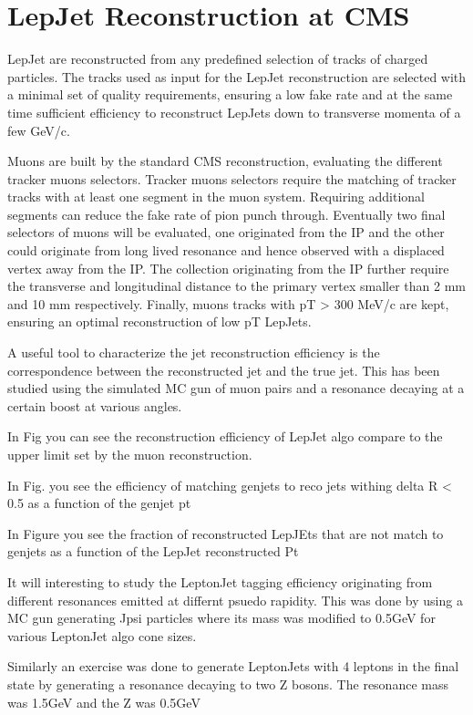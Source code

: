 \section{LepJet Reconstruction at CMS}
LepJet are reconstructed from any predefined selection of tracks of charged particles. 
The tracks used as input for the LepJet reconstruction are selected with a minimal set of quality requirements, ensuring a low fake rate and at the same time sufficient efficiency to reconstruct LepJets down to transverse momenta of a few GeV/c. 

Muons are built by the standard CMS reconstruction, evaluating the different tracker muons selectors.
Tracker muons  selectors require the matching of tracker tracks with at least one segment in the muon system.
Requiring additional segments can reduce the fake rate of pion punch through.
Eventually two final selectors of muons will be evaluated, one originated from the IP and the other could originate from long lived resonance and hence observed with a displaced vertex away from the IP.
The collection originating from the IP further require the transverse and longitudinal distance to the primary vertex smaller than 2 mm and 10 mm respectively.  Finally, muons tracks with pT > 300 MeV/c are kept, ensuring an optimal reconstruction of low pT LepJets.

A useful tool to characterize the jet reconstruction efficiency is the correspondence between the reconstructed jet and the true jet. This has been studied using the simulated MC gun of muon pairs and a resonance decaying at a certain boost at various angles.

In Fig you can see the reconstruction efficiency of LepJet algo compare to the upper limit set by the muon reconstruction.

In Fig. you see the efficiency of matching genjets to reco jets withing delta R < 0.5 as a function of the genjet pt

In Figure you see the fraction of reconstructed LepJEts that are not match to genjets as a function of the LepJet reconstructed Pt



It will interesting to study the LeptonJet tagging efficiency originating from different resonances emitted at differnt psuedo rapidity.  This was done by using a MC gun generating Jpsi particles where its mass was modified to 0.5GeV for various  LeptonJet algo cone sizes.


Similarly an exercise was done to generate LeptonJets with 4 leptons in the final state by generating a resonance decaying to two Z bosons. The resonance mass was 1.5GeV and the Z was 0.5GeV




